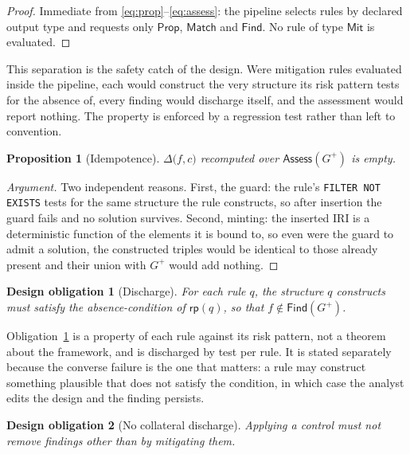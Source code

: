 \documentclass[11pt,a4paper]{article}
\theoremstyle{definition}
\theoremstyle{plain}
\newtheorem{proposition}{Proposition}
\newtheorem{obligation}{Design obligation}
\newcommand{\Arch}{G}
\newcommand{\Match}{\mathsf{Match}}
\newcommand{\Find}{\mathsf{Find}}
\newcommand{\Prop}{\mathsf{Prop}}
\newcommand{\Assess}{\mathsf{Assess}}
\begin{document}
\begin{proof}
Immediate from \eqref{eq:prop}--\eqref{eq:assess}: the pipeline selects rules by
declared output type and requests only $\Prop$, $\Match$ and $\Find$. No rule of
type $\mathsf{Mit}$ is evaluated.
\end{proof}

\noindent This separation is the safety catch of the design. Were mitigation
rules evaluated inside the pipeline, each would construct the very structure its
risk pattern tests for the absence of, every finding would discharge itself, and
the assessment would report nothing. The property is enforced by a regression
test rather than left to convention.

\begin{proposition}[Idempotence]
\label{prop:idempotent}
$\Delta\big(f, c\big)$ recomputed over $\Assess(\Arch^{+})$ is empty.
\end{proposition}

\begin{proof}[Argument]
Two independent reasons. First, the guard: the rule's
\texttt{FILTER NOT EXISTS} tests for the same structure the rule constructs, so
after insertion the guard fails and no solution survives. Second, minting: the
inserted IRI is a deterministic function of the elements it is bound to, so even
were the guard to admit a solution, the constructed triples would be identical
to those already present and their union with $\Arch^{+}$ would add nothing.
\end{proof}

\begin{obligation}[Discharge]
\label{obl:discharge}
For each rule $q$, the structure $q$ constructs must satisfy the
absence-condition of $\mathsf{rp}(q)$, so that $f \notin \Find(\Arch^{+})$.
\end{obligation}

\noindent Obligation~\ref{obl:discharge} is a property of each rule against its
risk pattern, not a theorem about the framework, and is discharged by test per
rule. It is stated separately because the converse failure is the one that
matters: a rule may construct something plausible that does not satisfy the
condition, in which case the analyst edits the design and the finding persists.

\begin{obligation}[No collateral discharge]
\label{obl:collateral}
Applying a control must not remove findings other than by mitigating them.
\end{obligation}
\end{document}
